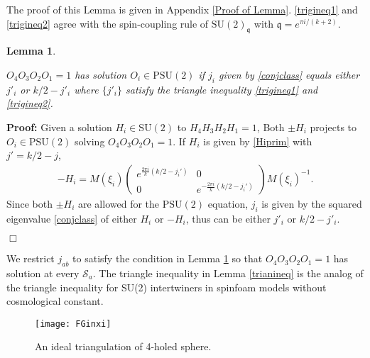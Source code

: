 \documentclass[aps,prd,notitlepage,nofootinbib,superscriptaddress,groupedaddress,twocolumn]{revtex4-1}
\newtheorem{lemma}[theorem]{Lemma}
\newcommand{\Su}{\mathrm{SU}(2)}
\newcommand{\PSu}{\mathrm{PSU}(2)}
\def\be{\begin{eqnarray}}
\def\ee{\end{eqnarray}}
\newcommand{\cs}{\mathcal S}
\newcommand{\fq}{\mathfrak{q}}  \newcommand{\Fq}{\mathfrak{Q}}
\begin{document}
The proof of this Lemma is given in Appendix \ref{Proof of Lemma}. \eqref{trigineq1} and \eqref{trigineq2} agree with the
spin-coupling rule of $\Su_\fq$ with $\fq=e^{\pi i/(k+2)}$.


\begin{lemma}\label{Oeqntrig}

$O_4O_3O_2O_1=1$ has solution $O_i\in\PSu$ if $j_{i}$ given by \eqref{conjclass} equals either $j'_i$ or $k/2-j'_i$ where $\{j'_i\}$ satisfy the triangle inequality \eqref{trigineq1} and \eqref{trigineq2}. 

\end{lemma}

\textbf{Proof:} Given a solution $H_i\in\Su$ to $H_4H_3H_2H_1=1$, Both $\pm H_i$ projects to $O_i\in \PSu$ solving $O_4O_3O_2O_1=1$. If $H_i$ is given by \eqref{Hiprim} with $j'=k/2-j$, 
\be
-H_i= M(\xi_i)\left(\begin{array}{cc}
	e^{\frac{2\pi i}{k}(k/2-j_i')} & 0 \\
 0 & e^{-\frac{2\pi i}{k}(k/2-j_i')}
 \end{array}\right)M(\xi_i)^{-1}.\nonumber
\ee
Since both $\pm H_i$ are allowed for the $\PSu$ equation, $j_{i}$ is given by the squared eigenvalue \eqref{conjclass} of either $H_i$ or $-H_i$, thus can be either $j'_i$ or $k/2-j'_i$. 

$\Box$


We restrict $j_{ab}$ to satisfy the condition in Lemma \ref{Oeqntrig} so that $O_4O_3O_2O_1=1$ has solution at every $\cs_a$. The triangle inequality in Lemma \ref{trianineq} is the analog of the triangle inequality for SU(2) intertwiners in spinfoam models without cosmological constant. 






\begin{figure}[h]
	\begin{center}
	\texttt{[image: FGinxi]}
	\caption{An ideal triangulation of 4-holed sphere.}
	\label{FGinxi}
	\end{center}
	\end{figure}
\end{document}
